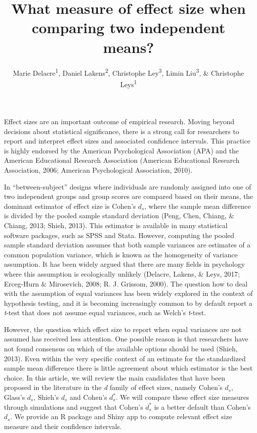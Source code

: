 \documentclass[
  english,
  man,floatsintext]{apa6}
\title{What measure of effect size when comparing two independent means?}
\author{Marie Delacre\textsuperscript{1}, Daniel Lakens\textsuperscript{2}, Christophe Ley\textsuperscript{3}, Limin Liu\textsuperscript{3}, \& Christophe Leys\textsuperscript{1}}
\date{}
\affiliation{\vspace{0.5cm}\textsuperscript{1} Université Libre de Bruxelles, Service of Analysis of the Data (SAD), Bruxelles, Belgium\\\textsuperscript{2} Eindhoven University of Technology, Human Technology Interaction Group, Eindhoven, the Netherlands\\\textsuperscript{3} Universiteit Gent, Department of Applied Mathematics, Computer Science and Statistics, Gent, Belgium}
\begin{document}
\maketitle

Effect sizes are an important outcome of empirical research. Moving beyond decisions about statistical significance, there is a strong call for researchers to report and interpret effect sizes and associated confidence intervals. This practice is highly endorsed by the American Psychological Association (APA) and the American Educational Research Association (American Educational Research Association, 2006; American Psychological Association, 2010).

In ``between-subject'' designs where individuals are randomly assigned into one of two independent groups and group scores are compared based on their means, the dominant estimator of effect size is Cohen's \(d_s\), where the sample mean difference is divided by the pooled sample standard deviation (Peng, Chen, Chiang, \& Chiang, 2013; Shieh, 2013). This estimator is available in many statistical software packages, such as SPSS and Stata. However, computing the pooled sample standard deviation assumes that both sample variances are estimates of a common population variance, which is known as the homogeneity of variance assumption. It has been widely argued that there are many fields in psychology where this assumption is ecologically unlikely (Delacre, Lakens, \& Leys, 2017; Erceg-Hurn \& Mirosevich, 2008; R. J. Grissom, 2000). The question how to deal with the assumption of equal variances has been widely explored in the context of hypothesis testing, and it is becoming increasingly common to by default report a \emph{t}-test that does not assume equal variances, such as Welch's \emph{t}-test.

However, the question which effect size to report when equal variances are not assumed has received less attention. One possible reason is that researchers have not found consensus on which of the available options should be used (Shieh, 2013). Even within the very specific context of an estimate for the standardized sample mean difference there is little agreement about which estimator is the best choice. In this article, we will review the main candidates that have been proposed in the literature in the \emph{d} family of effect sizes, namely Cohen's \(d_s\), Glass's \(d_s\), Shieh's \(d_s\) and Cohen's \(d^*_s\). We will compare these effect size measures through simulations and suggest that Cohen's \(d^*_s\) is a better default than Cohen's \(d_s\). We provide an R package and Shiny app to compute relevant effect size measure and their confidence intervals.
\end{document}
